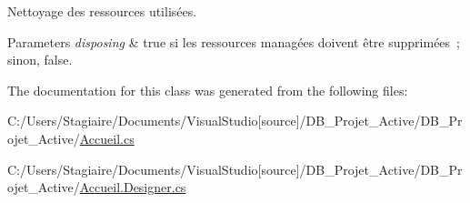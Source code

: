 Nettoyage des ressources utilisées. 


\begin{DoxyParams}{Parameters}
{\em disposing} & true si les ressources managées doivent être supprimées ; sinon, false.\\
\hline
\end{DoxyParams}


The documentation for this class was generated from the following files\+:\begin{DoxyCompactItemize}
\item 
C\+:/\+Users/\+Stagiaire/\+Documents/\+Visual\+Studio\mbox{[}source\mbox{]}/\+D\+B\+\_\+\+Projet\+\_\+\+Active/\+D\+B\+\_\+\+Projet\+\_\+\+Active/\mbox{\hyperlink{_accueil_8cs}{Accueil.\+cs}}\item 
C\+:/\+Users/\+Stagiaire/\+Documents/\+Visual\+Studio\mbox{[}source\mbox{]}/\+D\+B\+\_\+\+Projet\+\_\+\+Active/\+D\+B\+\_\+\+Projet\+\_\+\+Active/\mbox{\hyperlink{_accueil_8_designer_8cs}{Accueil.\+Designer.\+cs}}\end{DoxyCompactItemize}
